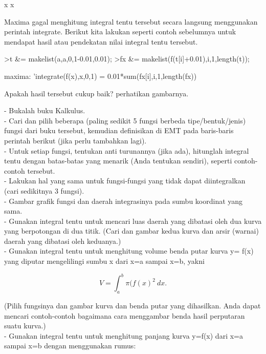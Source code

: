 \documentclass[a4paper,10pt]{article}
\begin{document}
\begin{eulernotebook}
\begin{euleroutput}
                                     x
                                    x
  
\end{euleroutput}
\begin{eulercomment}
Maxima gagal menghitung integral tentu tersebut secara langsung menggunakan perintah
integrate. Berikut kita lakukan seperti contoh sebelumnya untuk mendapat hasil atau
pendekatan nilai integral tentu tersebut.
\end{eulercomment}
\begin{eulerprompt}
>t &= makelist(a,a,0,1-0.01,0.01);
>fx &= makelist(f(t[i]+0.01),i,1,length(t));
\end{eulerprompt}
\begin{eulercomment}
maxima: 'integrate(f(x),x,0,1) = 0.01*sum(fx[i],i,1,length(fx))

Apakah hasil tersebut cukup baik? perhatikan gambarnya.
\end{eulercomment}
\begin{eulercomment}
- Bukalah buku Kalkulus.\\
- Cari dan pilih beberapa (paling sedikit 5 fungsi berbeda
tipe/bentuk/jenis) fungsi dari buku tersebut, kemudian definisikan di
EMT pada baris-baris perintah berikut (jika perlu tambahkan lagi).\\
- Untuk setiap fungsi, tentukan anti turunannya (jika ada), hitunglah
integral tentu dengan batas-batas yang menarik (Anda tentukan
sendiri), seperti contoh-contoh tersebut.\\
- Lakukan hal yang sama untuk fungsi-fungsi yang tidak dapat
diintegralkan (cari sedikitnya 3 fungsi).\\
- Gambar grafik fungsi dan daerah integrasinya pada sumbu koordinat
yang sama.\\
- Gunakan integral tentu untuk mencari luas daerah yang dibatasi oleh
dua kurva yang berpotongan di dua titik. (Cari dan gambar kedua kurva
dan arsir (warnai) daerah yang dibatasi oleh keduanya.)\\
- Gunakan integral tentu untuk menghitung volume benda putar kurva y=
f(x) yang diputar mengelilingi sumbu x dari x=a sampai x=b, yakni

\end{eulercomment}
\begin{eulerformula}
\[
V = \int_a^b \pi (f(x)^2\ dx.
\]
\end{eulerformula}
\begin{eulercomment}
(Pilih fungsinya dan gambar kurva dan benda putar yang dihasilkan.
Anda dapat mencari contoh-contoh bagaimana cara menggambar benda hasil
perputaran suatu kurva.)\\
- Gunakan integral tentu untuk menghitung panjang kurva y=f(x) dari
x=a sampai x=b dengan menggunakan rumus:


\end{eulercomment}
\end{eulernotebook}
\end{document}

